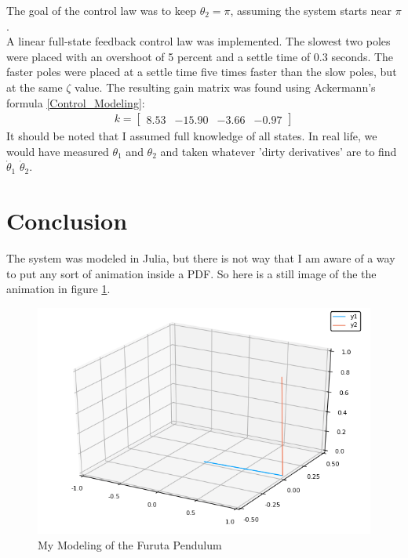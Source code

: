 \documentclass[letterpaper,10pt,oneside]{article}
\begin{document}
The goal of the control law was to keep $\theta_{2}=\pi$, assuming the system starts near $\pi$. \\

A linear full-state feedback control law was implemented. The slowest two poles were placed with an overshoot of 5 percent and a settle time of 0.3 seconds. The faster poles were placed at a settle time five times faster than the slow poles, but at the same $\zeta$ value. The resulting gain matrix was found using Ackermann's formula \ref{Control_Modeling}: \\


\begin{align}
  k = \left[\begin{array}{cccc}
  8.53 &
  -15.90 &
  -3.66 &
  -0.97
  \end{array}\right]
\end{align}
It should be noted that I assumed full knowledge of all states. In real life, we would have measured $\theta_{1}$ and $\theta_{2}$ and taken whatever 'dirty derivatives' are to find $\dot{\theta}_{1}$ $\dot{\theta}_{2}$.
\section{Conclusion}
The system was modeled in Julia, but there is not way that I am aware of a way to put any sort of animation inside a PDF. So here is a still image of the the animation in figure \ref{Animation}.
\clearpage
\begin{figure}[!h]
  \centering
  \includegraphics[width=1.0\textwidth]{AnimationPic}
  \caption{My Modeling of the Furuta Pendulum}
  \label{Animation}
\end{figure}
\end{document}
